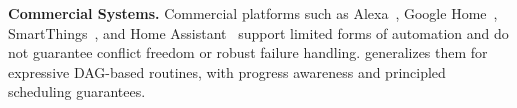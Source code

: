 {\noindent \textbf{Commercial Systems.}  
Commercial platforms such as Alexa~\cite{Alexa}, Google Home~\cite{GoogleHome}, SmartThings~\cite{SmartThings}, and Home Assistant~\cite{HomeAssistant} support limited forms of automation and do not guarantee conflict freedom or robust failure handling. 
\abs{} generalizes them for expressive DAG-based routines, with progress awareness and principled scheduling guarantees.
}
